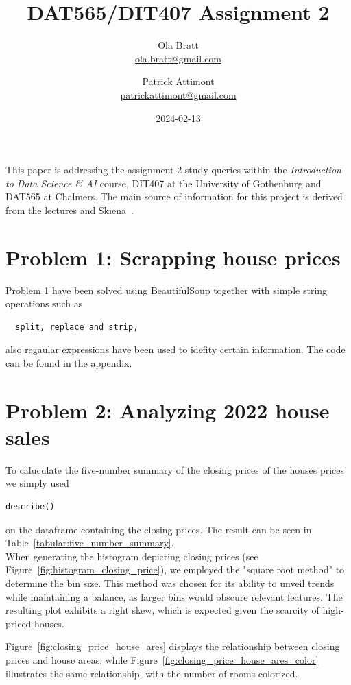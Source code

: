 \documentclass[a4paper]{article}
\begin{document}
\author{Ola Bratt \\
  \href{mailto:ola.bratt@gmail.com}{ola.bratt@gmail.com}
  \and
  Patrick Attimont \\
  \href{patrickattimont@gmail.com}{patrickattimont@gmail.com}
}

\title{DAT565/DIT407 Assignment 2}
\date{2024-02-13}

\maketitle

This paper is addressing the assignment 2 study queries within the \emph{Introduction to Data Science \& AI} course, DIT407 at 
the University of Gothenburg and DAT565 at Chalmers. The main source of information for this project
is derived from the lectures and Skiena~\cite{Skiena:2024}. 
\section*{Problem 1: Scrapping house prices}
Problem 1 have been solved using BeautifulSoup together with simple string operations such as 
\begin{verbatim}
  split, replace and strip, 
\end{verbatim}
also regaular expressions have been used to idefity certain information. The code can be found in the appendix.

\section*{Problem 2: Analyzing 2022 house sales}
To caluculate the five-number summary of the closing prices of the houses prices we simply used 
\begin{verbatim}
describe()
\end{verbatim}
on the dataframe containing the closing prices. The result can be seen in Table~\ref{tabular:five_number_summary}.\\

When generating the histogram depicting closing prices (see Figure~\ref{fig:histogram_closing_price}), we employed the "square root method" to determine the bin size. This method was chosen for its ability to unveil trends while maintaining a balance, as larger bins would obscure relevant features. The resulting plot exhibits a right skew, which is expected given the scarcity of high-priced houses.

Figure~\ref{fig:closing_price_house_ares} displays the relationship between closing prices and house areas, while Figure~\ref{fig:closing_price_house_ares_color} illustrates the same relationship, with the number of rooms colorized.
\end{document}
